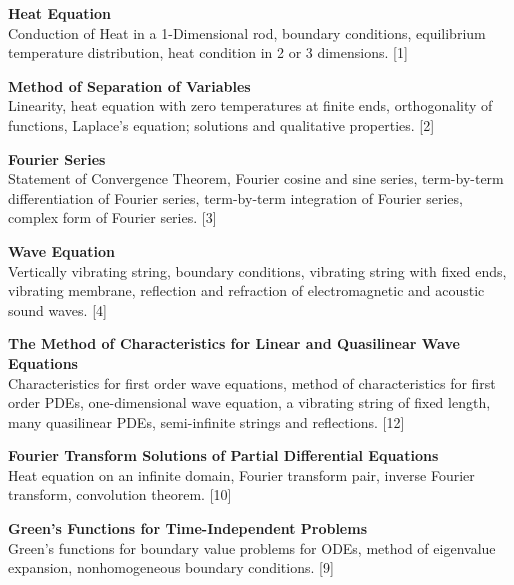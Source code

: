 \documentclass{article}
\begin{document}
\maketitle
{\small
  \noindent\textbf{Heat Equation}\\
  Conduction of Heat in a 1-Dimensional rod, boundary conditions, equilibrium temperature distribution, heat condition in 2 or 3 dimensions.\hspace*{\fill} [1]

  \vspace{10pt}
  \noindent\textbf{Method of Separation of Variables}\\
  Linearity, heat equation with zero temperatures at finite ends, orthogonality of functions, Laplace's equation; solutions and qualitative properties.\hspace*{\fill} [2]

  \vspace{10pt}
  \noindent\textbf{Fourier Series}\\
  Statement of Convergence Theorem, Fourier cosine and sine series, term-by-term differentiation of Fourier series, term-by-term integration of Fourier series, complex form of Fourier series.\hspace*{\fill} [3]

  \vspace{10pt}
  \noindent\textbf{Wave Equation}\\
  Vertically vibrating string, boundary conditions, vibrating string with fixed ends, vibrating membrane, reflection and refraction of electromagnetic and acoustic sound waves.\hspace*{\fill} [4]
  
  \vspace{10pt}
  \noindent\textbf{The Method of Characteristics for Linear and Quasilinear
  	Wave Equations}\\
  Characteristics for first order wave equations, method of characteristics for first order PDEs, one-dimensional wave equation, a vibrating string of fixed length, many quasilinear PDEs, semi-infinite strings and reflections. \hspace*{\fill} [12]
  
  \vspace{10pt}
  \noindent\textbf{Fourier Transform Solutions of Partial
  	Differential Equations}\\
  Heat equation on an infinite domain, Fourier transform pair, inverse Fourier transform, convolution theorem.\hspace*{\fill} [10]

  \vspace{10pt}
  \noindent\textbf{Green’s Functions for Time-Independent Problems}\\
  Green's functions for boundary value problems for ODEs, method of eigenvalue expansion, nonhomogeneous boundary conditions.\hspace*{\fill} [9]}
\end{document}
